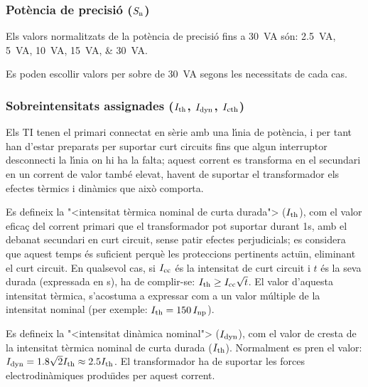 \subsubsection{Pot\`{e}ncia de precisi\'{o} ($S_\mathrm{n}$)}

 Els valors normalitzats de la pot\`{e}ncia de precisi\'{o} fins a \SI{30}{VA}
s\'{o}n: \SIlist{2,5; 5;10; 15; 30}{VA}.

Es poden escollir valors per sobre de \SI{30}{VA} segons les necessitats de cada cas.

\subsubsection{Sobreintensitats  assignades ($I_\mathrm{th}$, $I_\mathrm{dyn}$, $I_\mathrm{cth}$)}

 Els TI
tenen el primari connectat en s\`{e}rie amb una l\'{\i}nia de pot\`{e}ncia, i per tant han
d'estar preparats per suportar curt circuits fins que algun
interruptor desconnecti la l\'{\i}nia on hi ha la falta; aquest
corrent es transforma en el secundari en un corrent de valor
tamb\'{e} elevat, havent de suportar el transformador els efectes t\`{e}rmics
i din\`{a}mics que aix\`{o} comporta.

Es defineix la {"<}intensitat t\`{e}rmica nominal de curta durada{">}
($I_\mathrm{th}$), com el valor efica\c{c} del  corrent primari que el
transformador pot suportar durant 1\unit{s}, amb el debanat
secundari en curt circuit, sense patir efectes perjudicials; es
considera que aquest temps \'{e}s suficient perqu\`{e} les proteccions
pertinents actu\"{\i}n, eliminant el curt circuit. En qualsevol cas, si
$I_\mathrm{cc}$ \'{e}s la intensitat de curt circuit i $t$ \'{e}s la seva durada
(expressada en s), ha de complir-se: $I_\mathrm{th}\geq
I_\mathrm{cc}\sqrt{t}$. El valor d'aquesta intensitat t\`{e}rmica,
s'acostuma a expressar com a un valor m\'{u}ltiple de la intensitat
nominal (per exemple: $I_\mathrm{th}=150\,I_\mathrm{np}$).

Es defineix la {"<}intensitat din\`{a}mica nominal{">} ($I_\mathrm{dyn}$), com el
valor de cresta de la intensitat t\`{e}rmica nominal de curta durada ($I_\mathrm{th}$).
Normalment es pren el valor: $I_\mathrm{dyn} =
\num{1,8}\sqrt{2}I_\mathrm{th}\approx \num{2,5}I_\mathrm{th}$. El transformador ha de
suportar les forces electrodin\`{a}miques produ\"{\i}des per aquest corrent.

